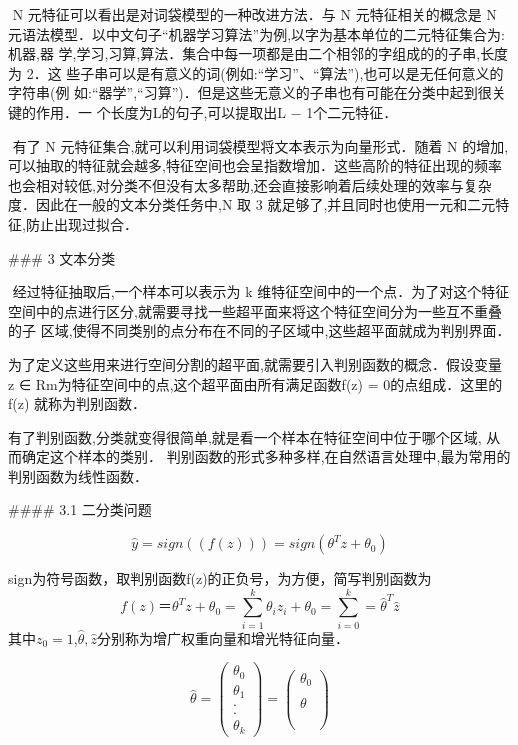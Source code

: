 ​	N 元特征可以看出是对词袋模型的一种改进方法．与 N 元特征相关的概念是 N 元语法模型．以中文句子“机器学习算法”为例,以字为基本单位的二元特征集合为:{机器,器 学,学习,习算,算法}．集合中每一项都是由二个相邻的字组成的的子串,长度为 2．这 些子串可以是有意义的词(例如:“学习”、“算法”),也可以是无任何意义的字符串(例 如:“器学”,“习算”)．但是这些无意义的子串也有可能在分类中起到很关键的作用．一 个长度为L的句子,可以提取出L − 1个二元特征．

​	有了 N 元特征集合,就可以利用词袋模型将文本表示为向量形式．随着 N 的增加, 可以抽取的特征就会越多,特征空间也会呈指数增加．这些高阶的特征出现的频率也会相对较低,对分类不但没有太多帮助,还会直接影响着后续处理的效率与复杂度．因此在一般的文本分类任务中,N 取 3 就足够了,并且同时也使用一元和二元特征,防止出现过拟合．

### 3 文本分类

​	经过特征抽取后,一个样本可以表示为 k 维特征空间中的一个点．为了对这个特征 空间中的点进行区分,就需要寻找一些超平面来将这个特征空间分为一些互不重叠的子 区域,使得不同类别的点分布在不同的子区域中,这些超平面就成为判别界面．

​	为了定义这些用来进行空间分割的超平面,就需要引入判别函数的概念．假设变量 z ∈ Rm为特征空间中的点,这个超平面由所有满足函数f(z) = 0的点组成．这里的f(z) 就称为判别函数．

​	有了判别函数,分类就变得很简单,就是看一个样本在特征空间中位于哪个区域, 从而确定这个样本的类别．  判别函数的形式多种多样,在自然语言处理中,最为常用的判别函数为线性函数．

#### 3.1 二分类问题

$$
\hat y =sign((f(z))) = sign(\theta^Tz+\theta_0)
$$

sign为符号函数，取判别函数f(z)的正负号，为方便，简写判别函数为
$$
f(z) ＝ \theta^Tz+\theta_0 = \sum_{i=1}^{k}\theta_iz_i + \theta_0 = \sum_{i=0}^{k} = \hat \theta^T \hat z
$$
其中$z_0=1$,$\hat\theta,\hat{z}$分别称为增广权重向量和增光特征向量．




$$
\hat \theta = \left( 
		\begin{array} {ccc} \theta_0 \\  \theta_1\\ .\\ .\\  \theta_k
		\end{array}
        	\right) =  \left( 
        	\begin{array}{ccc}
		\theta_0 \\ \\ \theta \\ \\  \\  
		\end{array}
        	\right)
$$

